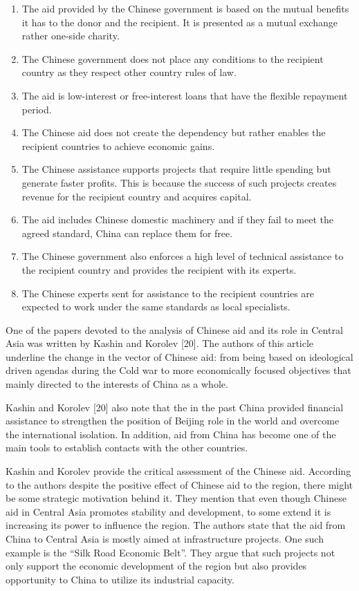 \begin{multicols}{2}
\begin{enumerate}
\def\labelenumi{\arabic{enumi}.}
\item
  The aid provided by the Chinese government is based on the mutual
  benefits it has to the donor and the recipient. It is presented as a
  mutual exchange rather one-side charity.
\item
  The Chinese government does not place any conditions to the recipient
  country as they respect other country rules of law.
\item
  The aid is low-interest or free-interest loans that have the flexible
  repayment period.
\item
  The Chinese aid does not create the dependency but rather enables the
  recipient countries to achieve economic gains.
\item
  The Chinese assistance supports projects that require little spending
  but generate faster profits. This is because the success of such
  projects creates revenue for the recipient country and acquires
  capital.
\item
  The aid includes Chinese domestic machinery and if they fail to meet
  the agreed standard, China can replace them for free.
\item
  The Chinese government also enforces a high level of technical
  assistance to the recipient country and provides the recipient with
  its experts.
\item
  The Chinese experts sent for assistance to the recipient countries are
  expected to work under the same standards as local specialists.
\end{enumerate}

One of the papers devoted to the analysis of Chinese aid and its role in
Central Asia was written by Kashin and Korolev {[}20{]}. The authors of
this article underline the change in the vector of Chinese aid: from
being based on ideological driven agendas during the Cold war to more
economically focused objectives that mainly directed to the interests of
China as a whole.

Kashin and Korolev {[}20{]} also note that the in the past China
provided financial assistance to strengthen the position of Beijing role
in the world and overcome the international isolation. In addition, aid
from China has become one of the main tools to establish contacts with
the other countries.

Kashin and Korolev provide the critical assessment of the Chinese aid.
According to the authors despite the positive effect of Chinese aid to
the region, there might be some strategic motivation behind it. They
mention that even though Chinese aid in Central Asia promotes stability
and development, to some extend it is increasing its power to influence
the region. The authors state that the aid from China to Central Asia is
mostly aimed at infrastructure projects. One such example is the ``Silk
Road Economic Belt''. They argue that such projects not only support the
economic development of the region but also provides opportunity to
China to utilize its industrial capacity.


\end{multicols}
